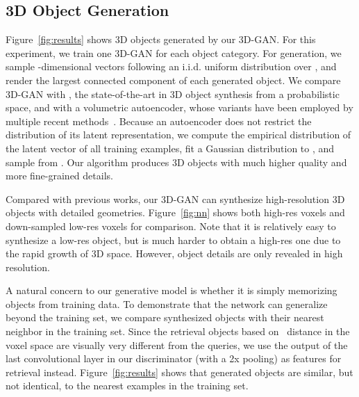 \documentclass{article}
\newcommand{\fig}[1]{Figure~\ref{#1}}
\newcommand{\model}{3D-GAN\xspace}
\newcommand{\presubsection}{\vspace{-8pt}}
\newcommand{\postsubsection}{\vspace{-6pt}}
\begin{document}
\presubsection
\subsection{3D Object Generation}
\postsubsection

\fig{fig:results} shows 3D objects generated by our \model. 
For this experiment, we train one \model for each object category. For generation, we sample -dimensional vectors following an i.i.d. uniform distribution over , and render the largest connected component of each generated object. 
We compare \model with \cite{wu20153d}, the state-of-the-art in 3D object synthesis from a probabilistic space, and with a volumetric autoencoder, whose variants have been employed by multiple recent methods~\citep{girdhar2016learning,sharma2016vconv}. Because an autoencoder does not restrict the distribution of its latent representation, we compute the empirical distribution  of the latent vector  of all training examples, fit a Gaussian distribution  to , and sample from . Our algorithm produces 3D objects with much higher quality and more fine-grained details.

Compared with previous works, our \model can synthesize high-resolution 3D objects with detailed geometries. \fig{fig:nn} shows both high-res voxels and down-sampled low-res voxels for comparison. Note that it is relatively easy to synthesize a low-res object, but is much harder to obtain a high-res one due to the rapid growth of 3D space. However, object details are only revealed in high resolution. 

A natural concern to our generative model is whether it is simply memorizing objects from training data. 
To demonstrate that the network can generalize beyond the training set, we compare synthesized objects with their nearest neighbor in the training set. Since the retrieval objects based on ~distance in the voxel space are visually very different from the queries, we use the output of the last convolutional layer in our discriminator (with a 2x pooling) as features for retrieval instead.
\fig{fig:results} shows that generated objects are similar, but not identical, to the nearest examples in the training set. 
\end{document}
